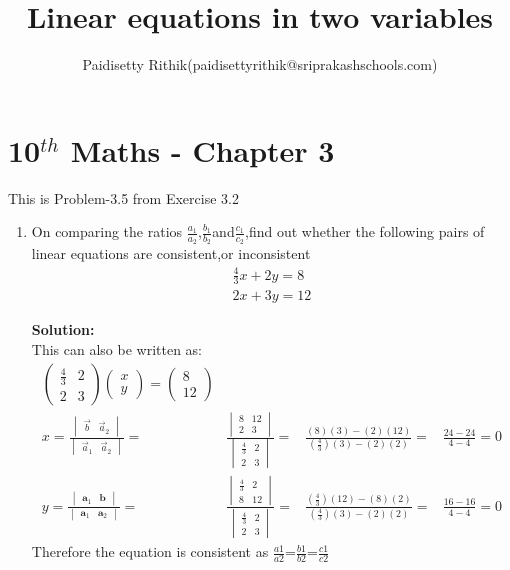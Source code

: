 \documentclass[12pt]{article}
\title{Linear equations in two variables}
\author{Paidisetty Rithik(paidisettyrithik@sriprakashschools.com)}
\newcommand{\myvec}[1]{\ensuremath{\begin{pmatrix}#1\end{pmatrix}}}
\newcommand{\mydet}[1]{\ensuremath{\begin{vmatrix}#1\end{vmatrix}}}
\newcommand{\solution}{\noindent \textbf{Solution: }}
\let\vec\mathbf
\begin{document}
\maketitle
\section*{10$^{th}$ Maths - Chapter 3}
This is Problem-3.5 from Exercise 3.2
\begin{enumerate}
\item On comparing the ratios $\frac{a_1}{a_2}$,$\frac{b_1}{b_2}$and$\frac{c_1}{c_2}$,find out whether the following pairs of linear equations are consistent,or inconsistent\\
\begin{align}
    \frac{4}{3}x+2y=8\\
       2x+3y=12
\end{align}

\solution \\
This can also be written as:
\begin{align}
\myvec{\frac{4}{3}&2\\2&3}\myvec{x\\y} =\myvec{8\\12} \\
x=\frac{\mydet{\Vec{b} & \Vec{a}_2}}{\mydet{ \Vec{a}_1 & \Vec{a}_2}} =&
\frac{\mydet{ 8 & 12 \\ 2 & 3}}{\mydet{\frac{4}{3}&2\\2&3}}=&
\frac{(8)(3)-(2)(12)}{(\frac{4}{3})(3)-(2)(2)}=&
\frac{24-24}{4-4}=0\\
y=\frac{\mydet{\vec{a}_1&\vec{b}}}{\mydet{\vec{a}_1&\vec{a}_2}} =&
\frac{\mydet{\frac{4}{3}&2\\8&12}}{\mydet{\frac{4}{3}&2\\2&3}}=&
\frac{(\frac{4}{3})(12)-(8)(2)}{(\frac{4}{3})(3)-(2)(2)}=&
\frac{16-16}{4-4}=0 
\end{align}
Therefore the equation is consistent as $\frac{a1}{a2}$=$\frac{b1}{b2}$=$\frac{c1}{c2}$
	

\end{enumerate}
\end{document}
